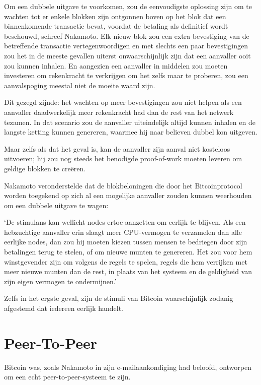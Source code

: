 \documentclass[smalldemyvopaper,11pt,twoside,onecolumn,openright,extrafontsizes,hidelinks]{memoir}
\begin{document}
Om een dubbele uitgave te voorkomen, zou de eenvoudigste oplossing zijn
om te wachten tot er enkele blokken zijn ontgonnen boven op het blok dat
een binnenkomende transactie bevat, voordat de betaling als definitief
wordt beschouwd, schreef Nakamoto. Elk nieuw blok zou een extra
bevestiging van de betreffende transactie vertegenwoordigen en met
slechts een paar bevestigingen zou het in de meeste gevallen uiterst
onwaarschijnlijk zijn dat een aanvaller ooit zou kunnen inhalen. En
aangezien een aanvaller in middelen zou moeten investeren om rekenkracht
te verkrijgen om het zelfs maar te proberen, zou een aanvalspoging
meestal niet de moeite waard zijn.

Dit gezegd zijnde: het wachten op meer bevestigingen zou niet helpen als
een aanvaller daadwerkelijk meer rekenkracht had dan de rest van het
netwerk tezamen. In dat scenario zou de aanvaller uiteindelijk altijd
kunnen inhalen en de langste ketting kunnen genereren, waarmee hij naar
believen dubbel kon uitgeven.

Maar zelfs als dat het geval is, kan de aanvaller zijn aanval niet
kosteloos uitvoeren; hij zou nog steeds het benodigde proof-of-work
moeten leveren om geldige blokken te creëren.

Nakamoto veronderstelde dat de blokbeloningen die door het
Bitcoinprotocol worden toegekend op zich al een mogelijke aanvaller
zouden kunnen weerhouden om een dubbele uitgave te wagen:

`De stimulans kan wellicht nodes ertoe aanzetten om eerlijk te blijven.
Als een hebzuchtige aanvaller erin slaagt meer CPU-vermogen te
verzamelen dan alle eerlijke nodes, dan zou hij moeten kiezen tussen
mensen te bedriegen door zijn betalingen terug te stelen, of om nieuwe
munten te genereren. Het zou voor hem winstgevender zijn om volgens de
regels te spelen, regels die hem verrijken met meer nieuwe munten dan de
rest, in plaats van het systeem en de geldigheid van zijn eigen vermogen
te ondermijnen.'

Zelfs in het ergste geval, zijn de stimuli van Bitcoin waarschijnlijk
zodanig afgestemd dat iedereen eerlijk handelt.

\section{Peer-To-Peer}\label{peer-to-peer}

Bitcoin was, zoals Nakamoto in zijn e-mailaankondiging had beloofd,
ontworpen om een echt peer-to-peer-systeem te zijn.
\end{document}

